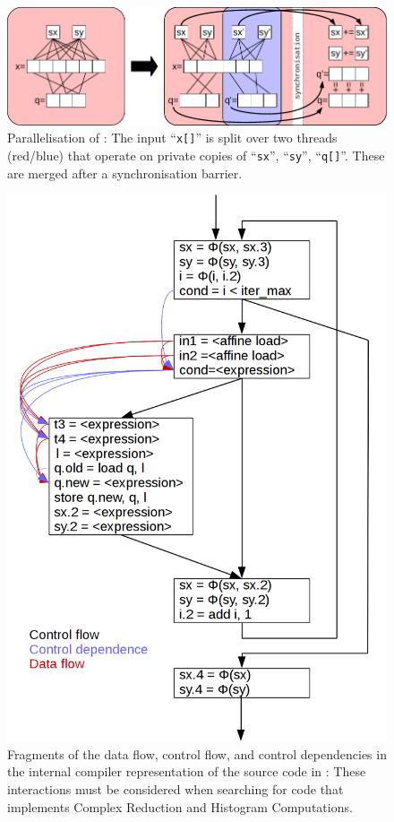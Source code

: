 \begin{figure}[t]
\centering
\includegraphics[width=\textwidth]{figures/parallelisereduction.pdf}
\caption{Parallelisation of :
         The input ``\texttt{x[]}'' is split over two threads (red/blue)
         that operate on private copies of ``\texttt{sx}'', ``\texttt{sy}'',
         ``\texttt{q[]}''.
         These are merged after a synchronisation barrier.}
\label{nice-picture}
\end{figure}

\begin{figure}[p]
\centering
\includegraphics[width=\textwidth]{figures/nicepicture2.png}
\caption{Fragments of the data flow, control flow, and control dependencies in
         the internal compiler representation of the source code in
         :
         These interactions must be considered when searching for code that
         implements Complex Reduction and Histogram Computations.}
\label{nice-picture2}
\end{figure}

